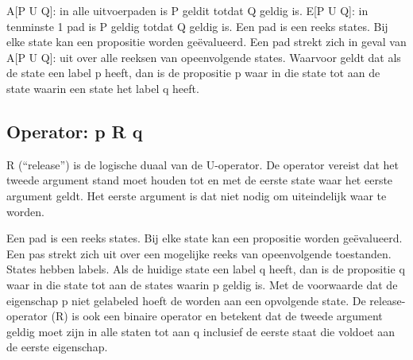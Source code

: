 \documentclass{article}
\begin{document}
	A[P U Q]: in alle uitvoerpaden is P geldit totdat Q geldig is.  
	E[P U Q]: in tenminste 1 pad is P geldig totdat Q geldig is.	
	Een pad is een reeks states. Bij elke state kan een propositie worden geëvalueerd. Een pad strekt zich in geval van A[P U Q]: uit over alle  reeksen van opeenvolgende states.
	Waarvoor geldt dat als de   state een label p heeft, dan is de propositie p waar in die state tot aan de state waarin een state het label q heeft.
	
	
	\subsection{Operator: p R q}
	R (“release”) is de logische duaal van de U-operator. De operator vereist
	dat het tweede argument stand moet houden tot en met de
	eerste state waar het eerste argument geldt. Het eerste argument is dat niet
	nodig om uiteindelijk waar te worden.
	
	
	Een pad is een reeks states. Bij elke state kan een propositie worden geëvalueerd. Een pas strekt zich uit over een mogelijke reeks van opeenvolgende toestanden.
	States hebben labels. Als de huidige state een label q heeft, dan is de propositie q  waar in die state tot aan de states waarin p geldig is. Met de voorwaarde dat de eigenschap p niet gelabeled hoeft de worden aan een opvolgende state.	
	De release-operator (R) is ook een binaire operator en betekent dat de tweede argument geldig moet zijn in alle staten  tot aan q inclusief de eerste staat die voldoet aan de
	eerste eigenschap.  
	
	
	
\end{document}
